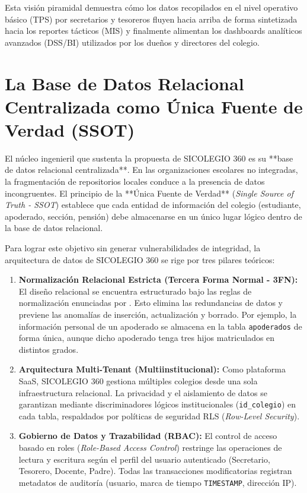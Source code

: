 \documentclass[12pt,a4paper,oneside]{report}
\begin{document}
Esta visión piramidal demuestra cómo los datos recopilados en el nivel operativo básico (TPS) por secretarios y tesoreros fluyen hacia arriba de forma sintetizada hacia los reportes tácticos (MIS) y finalmente alimentan los dashboards analíticos avanzados (DSS/BI) utilizados por los dueños y directores del colegio.

\section{La Base de Datos Relacional Centralizada como Única Fuente de Verdad (SSOT)}

El núcleo ingenieril que sustenta la propuesta de SICOLEGIO 360 es su **base de datos relacional centralizada**. En las organizaciones escolares no integradas, la fragmentación de repositorios locales conduce a la presencia de datos incongruentes. El principio de la **Única Fuente de Verdad** (\textit{Single Source of Truth - SSOT}) establece que cada entidad de información del colegio (estudiante, apoderado, sección, pensión) debe almacenarse en un único lugar lógico dentro de la base de datos relacional.

Para lograr este objetivo sin generar vulnerabilidades de integridad, la arquitectura de datos de SICOLEGIO 360 se rige por tres pilares teóricos:

\begin{enumerate}
    \item \textbf{Normalización Relacional Estricta (Tercera Forma Normal - 3FN):} El diseño relacional se encuentra estructurado bajo las reglas de normalización enunciadas por \citet{date2004}. Esto elimina las redundancias de datos y previene las anomalías de inserción, actualización y borrado. Por ejemplo, la información personal de un apoderado se almacena en la tabla \texttt{apoderados} de forma única, aunque dicho apoderado tenga tres hijos matriculados en distintos grados.
    \item \textbf{Arquitectura Multi-Tenant (Multiinstitucional):} Como plataforma SaaS, SICOLEGIO 360 gestiona múltiples colegios desde una sola infraestructura relacional. La privacidad y el aislamiento de datos se garantizan mediante discriminadores lógicos institucionales (\texttt{id\_colegio}) en cada tabla, respaldados por políticas de seguridad RLS (\textit{Row-Level Security}).
    \item \textbf{Gobierno de Datos y Trazabilidad (RBAC):} El control de acceso basado en roles (\textit{Role-Based Access Control}) restringe las operaciones de lectura y escritura según el perfil del usuario autenticado (Secretario, Tesorero, Docente, Padre). Todas las transacciones modificatorias registran metadatos de auditoría (usuario, marca de tiempo \texttt{TIMESTAMP}, dirección IP).
\end{enumerate}
\end{document}

